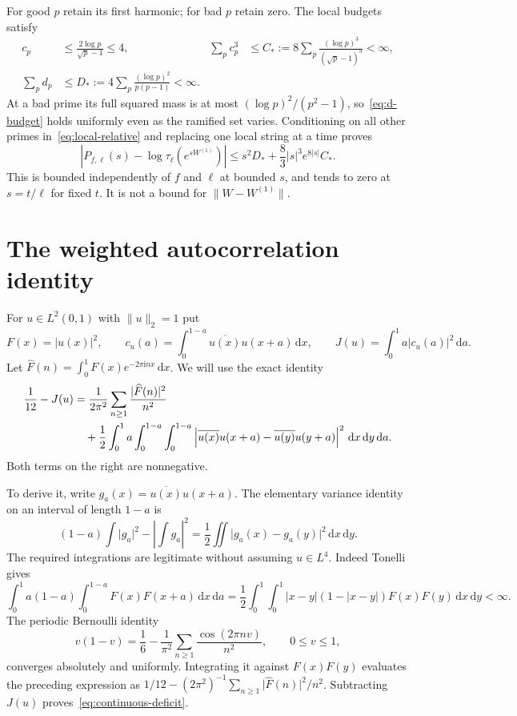 \documentclass[11pt,reqno]{amsart}
\numberwithin{equation}{section}
\newcommand{\dd}{\,\mathrm d}
\newcommand{\ii}{\mathrm i}
\newcommand{\norm}[1]{\lVert#1\rVert}
\newcommand{\abs}[1]{\lvert#1\rvert}
\begin{document}
For good $p$ retain its first harmonic; for bad $p$ retain zero.
The local budgets satisfy
\begin{align}
 c_p&\le\frac{2\log p}{\sqrt p-1}\le4,
 &\sum_pc_p^3&\le C_*:=8\sum_p\frac{(\log p)^3}{(\sqrt p-1)^3}<\infty,
 \label{eq:c-budget}\\
 \sum_pd_p&\le D_*:=4\sum_p\frac{(\log p)^2}{p(p-1)}<\infty.
 \label{eq:d-budget}
\end{align}
At a bad prime its full squared mass is at most
$(\log p)^2/(p^2-1)$, so~\eqref{eq:d-budget} holds uniformly
even as the ramified set varies. Conditioning on all other primes
in~\eqref{eq:local-relative} and replacing one local string at a
time proves
\begin{equation}\label{eq:full-local-bound}
 \left|P_{f,\ell}(s)-\log\tau_\ell(e^{sW^{(1)}})\right|
 \le s^2D_*+\frac83\abs s^3e^{8\abs s}C_*.
\end{equation}
This is bounded independently of $f$ and $\ell$ at bounded $s$,
and tends to zero at $s=t/\ell$ for fixed $t$.
It is not a bound for $\norm{W-W^{(1)}}$.

\section{The weighted autocorrelation identity}\label{sec:profile}

For $u\in L^2(0,1)$ with $\norm u_2=1$ put
\[
 F(x)=\abs{u(x)}^2,\qquad
 c_u(a)=\int_0^{1-a}\overline{u(x)}u(x+a)\dd x,
 \qquad J(u)=\int_0^1a\abs{c_u(a)}^2\dd a.
\]
Let $\widehat F(n)=\int_0^1F(x)e^{-2\pi\ii nx}\dd x$.
We will use the exact identity
\begin{align}\label{eq:continuous-deficit}
 \frac1{12}-J(u)
 &=\frac1{2\pi^2}\sum_{n\ge1}\frac{\abs{\widehat F(n)}^2}{n^2}
 \notag\\
 &\quad+\frac12\int_0^1a\int_0^{1-a}\int_0^{1-a}
  \left|\overline{u(x)}u(x+a)-\overline{u(y)}u(y+a)\right|^2
             \dd x\dd y\dd a.
\end{align}
Both terms on the right are nonnegative.

To derive it, write $g_a(x)=\overline{u(x)}u(x+a)$. The elementary
variance identity on an interval of length $1-a$ is
\[
 (1-a)\int\abs{g_a}^2-\left|\int g_a\right|^2
   =\frac12\iint\abs{g_a(x)-g_a(y)}^2\dd x\dd y.
\]
The required integrations are legitimate without assuming $u\in L^4$.
Indeed Tonelli gives
\[
 \int_0^1a(1-a)\int_0^{1-a}F(x)F(x+a)\dd x\dd a
 =\frac12\int_0^1\int_0^1
   \abs{x-y}(1-\abs{x-y})F(x)F(y)\dd x\dd y<\infty.
\]
The periodic Bernoulli identity
\[
 v(1-v)=\frac16-\frac1{\pi^2}
                  \sum_{n\ge1}\frac{\cos(2\pi nv)}{n^2},
 \qquad 0\le v\le1,
\]
converges absolutely and uniformly. Integrating it against
$F(x)F(y)$ evaluates the preceding expression as
$1/12-(2\pi^2)^{-1}\sum_{n\ge1}\abs{\widehat F(n)}^2/n^2$.
Subtracting $J(u)$ proves~\eqref{eq:continuous-deficit}.
\end{document}
